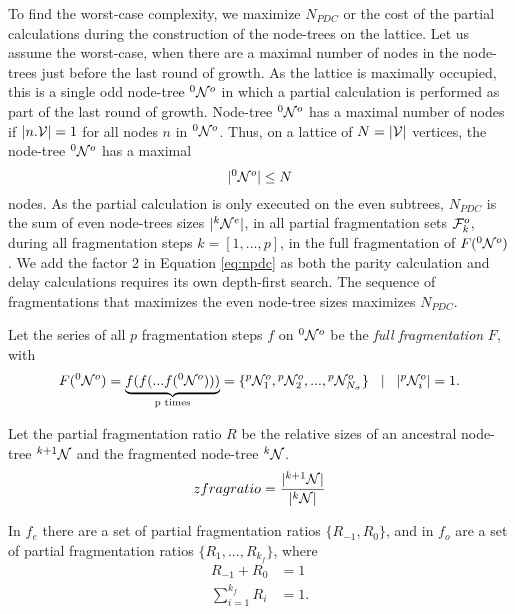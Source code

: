 To find the worst-case complexity, we maximize $N_{PDC}$ or the cost of the partial calculations during the construction of the node-trees on the lattice. Let us assume the worst-case, when there are a maximal number of nodes in the node-trees just before the last round of growth. As the lattice is maximally occupied, this is a single odd node-tree ${}^{0}\mathcal{N}^o$ in which a partial calculation is performed as part of the last round of growth. Node-tree ${}^{0}\mathcal{N}^o$ has a maximal number of nodes if $|n.\mathcal{V}|=1$ for all nodes $n$ in ${}^{0}\mathcal{N}^o$. Thus, on a lattice of $N=|\mathcal{V}|$ vertices, the node-tree ${}^{0}\mathcal{N}^o$ has a maximal
\begin{equation}\label{eq:limitnsetsize}
  \abs{\pre{0}\nset^o} \leq N
\end{equation}
nodes. As the partial calculation is only executed on the even subtrees, $N_{PDC}$ is the sum of even node-trees sizes $|{}^{k}\mathcal{N}^e|$, in all partial fragmentation sets $\mathcal{F}^o_{k}$, during all fragmentation steps $k=[1,...,p]$, in the full fragmentation of $F({}^{0}\mathcal{N}^o)$. We add the factor 2 in Equation \eqref{eq:npdc} as both the parity calculation and delay calculations requires its own depth-first search. The sequence of fragmentations that maximizes the even node-tree sizes maximizes $N_{PDC}$.
\begin{definition}\label{def:fullfrag}
  Let the series of all $p$ fragmentation steps $f$ on ${}^{0}\mathcal{N}^o$ be the \emph{full fragmentation} $F$, with
  \begin{equation}\label{eq:fullfrag}
    F(\pre{0}\nset^o) = \underbrace{f(f(...f(\pre{0}\nset^o)))}_\text{p times} = \{\pre{p}\nset^{o}_1, \pre{p}\nset^{o}_2,...,\pre{p}\nset^{o}_{N_\sigma} \} \hspace{.3cm} | \hspace{.3cm} \abs{\pre{p}\nset^{o}_i} = 1.
  \end{equation}
\end{definition}

\begin{definition}\label{lem:fragratio}
  Let the partial fragmentation ratio $R$ be the relative sizes of an ancestral node-tree ${}^{k+1}\mathcal{N}$ and the fragmented node-tree ${}^{k}\mathcal{N}$.
  \begin{equation}\label{eq:fragratio}
    zfragratio = \frac{\abs{\pre{k+1}\nset}}{\abs{\pre{k}\nset}}
  \end{equation}
\end{definition}
In $f_e$ there are a set of partial fragmentation ratios $\{R_{-1}, R_0\}$, and in $f_o$ are a set of partial fragmentation ratios $\{R_1,...,R_{k_f}\}$, where
\begin{align}
  R_{-1} +  R_0         & = 1  \\
  \sum_{i=1}^{k_f}{R_i} & = 1.
\end{align}

